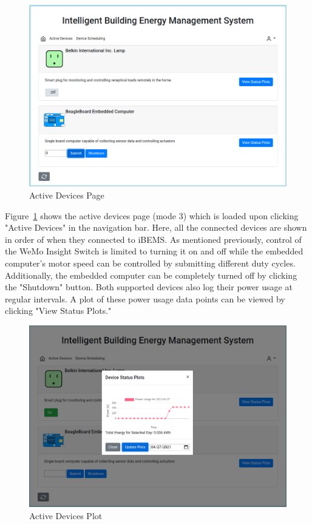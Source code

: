 \begin{figure}[H]
    \centering
    \includegraphics[scale=0.35]{figs/ActiveDevices_screen.png}
    \caption{Active Devices Page}
    \label{fig:active_devices}
\end{figure}

Figure~\ref{fig:active_devices} shows the active devices page (mode 3) which is loaded upon clicking "Active Devices" in the navigation bar. Here, all the connected devices are shown in order of when they connected to iBEMS. As mentioned previously, control of the WeMo Insight Switch is limited to turning it on and off while the embedded computer's motor speed can be controlled by submitting different duty cycles. Additionally, the embedded computer can be completely turned off by clicking the "Shutdown" button. Both supported devices also log their power usage at regular intervals. A plot of these power usage data points can be viewed by clicking "View Status Plots."

\begin{figure}[H]
    \centering
    \includegraphics[scale=0.35]{figs/ActiveDevices_plot.png}
    \caption{Active Devices Plot}
    \label{fig:active_devices_plot}
\end{figure}


